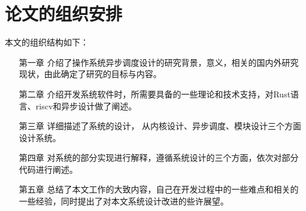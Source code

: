 \section{论文的组织安排}

本文的组织结构如下：

\begin{itemize}
\item[第一章] 介绍了操作系统异步调度设计的研究背景，意义，相关的国内外研究现状，由此确定了研究的目标与内容。
\item[第二章] 介绍开发系统软件时，所需要具备的一些理论和技术支持，对Rust语言、riscv和异步设计做了阐述。
\item[第三章] 详细描述了系统的设计， 从内核设计、异步调度、模块设计三个方面设计系统。
\item[第四章] 对系统的部分实现进行解释，遵循系统设计的三个方面，依次对部分代码进行阐述。
\item[第五章] 总结了本文工作的大致内容，自己在开发过程中的一些难点和相关的一些经验，同时提出了对本文系统设计改进的些许展望。
\end{itemize}
